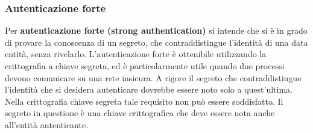 \subsubsection{Autenticazione forte}
Per \textbf{autenticazione forte (strong authentication)} si intende che si è in grado di provare la conoscenza di un segreto, che contraddistingue l'identità di una data entità, senza rivelarlo. L'autenticazione forte è ottenibile utilizzando la crittografia a chiave segreta, ed è particolarmente utile quando due processi devono comunicare su una rete insicura. A rigore il segreto che contraddistingue l'identità che si desidera autenticare dovrebbe essere noto solo a quest'ultima. Nella crittografia chiave segreta tale requisito non può essere soddisfatto. Il segreto in questione è una chiave crittografica che deve essere nota anche all'entità autenticante.

